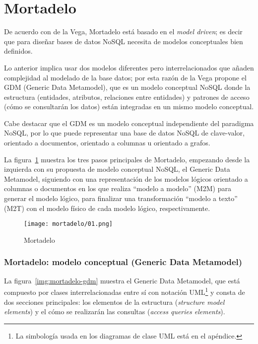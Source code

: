 \section{Mortadelo}
De acuerdo con de la Vega\cite{de_la_vega_mortadelo_2020}, Mortadelo está basado en el \textit{model driven}; es decir que para diseñar bases de datos NoSQL necesita de modelos conceptuales bien definidos.


Lo anterior implica usar dos modelos diferentes pero interrelacionados que añaden complejidad al modelado de la base datos; por esta razón de la Vega propone el GDM (Generic Data Metamodel), que es un modelo conceptual NoSQL donde la estructura (entidades, atributos, relaciones entre entidades) y patrones de acceso (cómo se consultarán los datos) están integradas en un mismo modelo conceptual.


Cabe destacar que el GDM es un modelo conceptual independiente del paradigma NoSQL, por lo que puede representar una base de datos NoSQL de clave-valor, orientado a documentos, orientado a columnas u orientado a grafos.


La figura~\ref{img:mortadelo-process} muestra los tres pasos principales de Mortadelo, empezando desde la izquierda con su propuesta de modelo conceptual NoSQL, el Generic Data Metamodel, siguiendo con una representación de los modelos lógicos orientado a columnas o documentos en los que realiza ``modelo a modelo'' (M2M) para generar el modelo lógico, para finalizar una transformación ``modelo a texto'' (M2T) con el modelo físico de cada modelo lógico, respectivamente.


\begin{figure}[H] 
    \centering
    \texttt{[image: mortadelo/01.png]}
    \caption{Mortadelo}
    \label{img:mortadelo-process}
\end{figure}

\subsubsection*{Mortadelo: modelo conceptual (Generic Data Metamodel)}

La figura~\ref{img:mortadelo-gdm} muestra el Generic Data Metamodel, que está compuesto por clases interrelacionadas entre sí con notación UML\footnote{La simbología usada en los diagramas de clase UML está en el apéndice.} y consta de dos secciones principales: los elementos de la estructura (\textit{structure model elements}) y el cómo se realizarán las consultas (\textit{access queries elements}).


